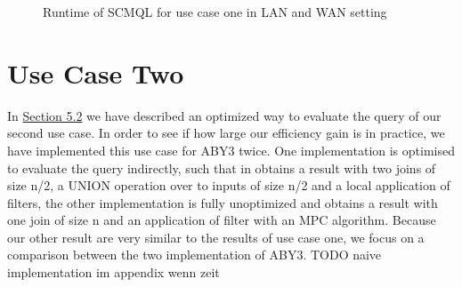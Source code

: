 \begin{figure}[H]
	\caption{Runtime of SCMQL for use case one in LAN and WAN setting}
\end{figure}

\section{Use Case Two} 
In \hyperref[use_case2]{Section 5.2} we have described an optimized way to evaluate the query of our second use case. In order to see if how large our efficiency gain is in practice, we have implemented this use case for ABY3 twice. One implementation is optimised to evaluate the query indirectly, such that in obtains a result with two joins of size n/2, a UNION operation over to inputs of size n/2 and a local application of filters, the other implementation is fully unoptimized and obtains a result with one join of size n and  an application of filter with an MPC algorithm. Because our other result are very similar to the results of use case one, we focus on a comparison between the two implementation of ABY3.  TODO naive implementation im appendix wenn zeit
